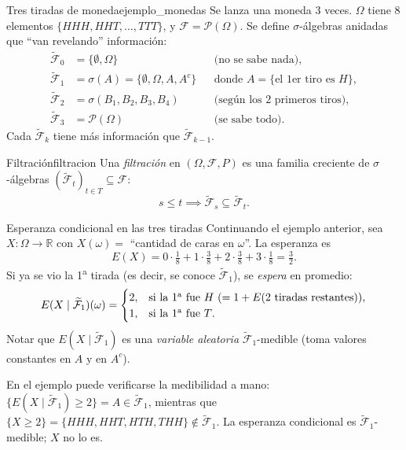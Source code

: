 \documentclass[11pt, a4paper]{article}
\begin{document}
\begin{ejemplo}{Tres tiradas de moneda}{ejemplo_monedas}
Se lanza una moneda 3 veces. $\Omega$ tiene 8 elementos $\{HHH, HHT, \dots, TTT\}$, y $\mathcal{F}
= \mathcal{P}(\Omega)$. Se define $\sigma$-álgebras anidadas que ``van revelando''
información:
\begin{align*}
\widetilde{\mathcal{F}}_0 &= \{\emptyset, \Omega\} && \text{(no se sabe nada)}, \\
\widetilde{\mathcal{F}}_1 &= \sigma(A) = \{\emptyset, \Omega, A, A^c\} && \text{donde } A
= \{\text{el 1er tiro es }H\}, \\
\widetilde{\mathcal{F}}_2 &= \sigma(B_1, B_2, B_3, B_4) && \text{(según los 2 primeros tiros)}, \\
\widetilde{\mathcal{F}}_3 &= \mathcal{P}(\Omega) && \text{(se sabe todo)}.
\end{align*}
Cada $\widetilde{\mathcal{F}}_k$ tiene más información que $\widetilde{\mathcal{F}}_{k-1}$.
\end{ejemplo}

\begin{definicion}{Filtración}{filtracion}
Una \emph{filtración} en $(\Omega, \mathcal{F}, P)$ es una familia creciente de
$\sigma$-álgebras $(\widetilde{\mathcal{F}}_t)_{t \in T} \subseteq \mathcal{F}$:
$$ s \le t \implies \widetilde{\mathcal{F}}_s \subseteq \widetilde{\mathcal{F}}_t. $$
\end{definicion}

\begin{ejemplo}{Esperanza condicional en las tres tiradas}{}
Continuando el ejemplo anterior, sea $X: \Omega \to \mathbb{R}$ con $X(\omega) = $ ``cantidad de
caras en $\omega$''. La esperanza es
$$ E(X) = 0 \cdot \tfrac{1}{8} + 1 \cdot \tfrac{3}{8} + 2 \cdot \tfrac{3}{8} + 3 \cdot \tfrac{1}{8}
= \tfrac{3}{2}. $$
Si ya se vio la 1\textsuperscript{a} tirada (es decir, se conoce $\widetilde{\mathcal{F}}_1$),
se \emph{espera} en promedio:
$$ E(X \mid \widetilde{\mathcal{F}}_1)(\omega) = \begin{cases}
2, & \text{si la 1\textsuperscript{a} fue $H$} \ (= 1 + E(\text{2 tiradas restantes})), \\
1, & \text{si la 1\textsuperscript{a} fue $T$}.
\end{cases} $$
Notar que $E(X \mid \widetilde{\mathcal{F}}_1)$ es una \emph{variable aleatoria}
$\widetilde{\mathcal{F}}_1$-medible (toma valores constantes en $A$ y en $A^c$).
\end{ejemplo}

\obs En el ejemplo puede verificarse la medibilidad a mano:
$\{E(X \mid \widetilde{\mathcal{F}}_1) \ge 2\} = A \in \widetilde{\mathcal{F}}_1$, mientras que
$\{X \ge 2\} = \{HHH, HHT, HTH, THH\} \notin \widetilde{\mathcal{F}}_1$. La esperanza
condicional es $\widetilde{\mathcal{F}}_1$-medible; $X$ no lo es.
\end{document}
